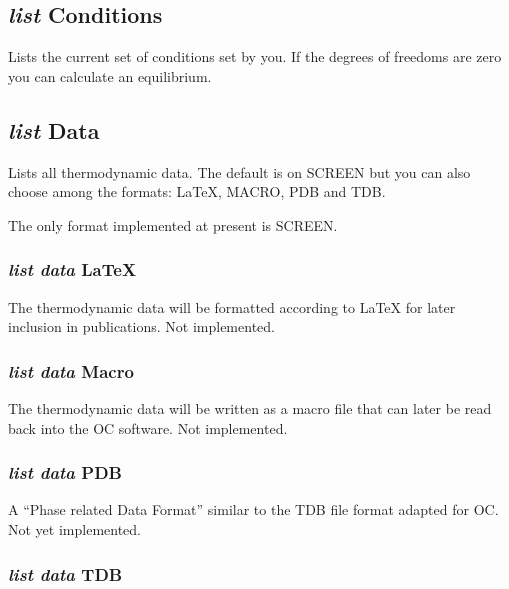 \documentclass[11pt]{article}
\begin{document}
\subsection{{\em list} Conditions}

Lists the current set of conditions set by you.  If the degrees
of freedoms are zero you can calculate an equilibrium.

\hypertarget{Output format for screen}{}
\hypertarget{Output format}{}
\hypertarget{List data}{}
\subsection{{\em list} Data}

Lists all thermodynamic data.  The default is on SCREEN but you can
also choose among the formats: LaTeX, MACRO, PDB and TDB.

The only format implemented at present is SCREEN.

\hypertarget{List data LaTeX}{}
\subsubsection{{\em list data} LaTeX}

The thermodynamic data will be formatted according to LaTeX for later
inclusion in publications.  Not implemented.

\hypertarget{List data macro}{}
\subsubsection{{\em list data} Macro}

The thermodynamic data will be written as a macro file that can later
be read back into the OC software.  Not implemented.

\hypertarget{List data PDB}{}
\subsubsection{{\em list data} PDB}

A ``Phase related Data Format'' similar to the TDB file
format adapted for OC.  Not yet implemented.

\hypertarget{List data TDB}{}
\subsubsection{{\em list data} TDB}
\end{document}
